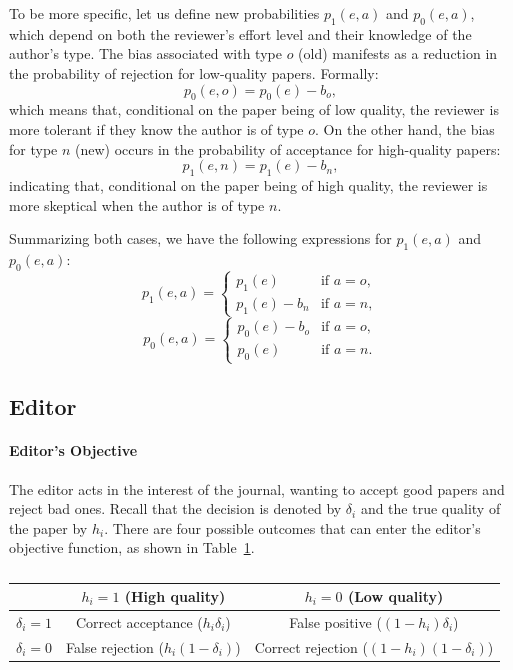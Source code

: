 \documentclass[12pt]{article}
\begin{document}
To be more specific, let us define new probabilities $p_1(e, a)$ and $p_0(e,
    a)$, which depend on both the reviewer's effort level and their knowledge of
the author's type. The bias associated with type $o$ (old) manifests as a
reduction in the probability of rejection for low-quality papers. Formally:
\[
    p_0(e, o) = p_0(e) - b_o,
\]
which means that, conditional on the paper being of low quality, the reviewer
is more tolerant if they know the author is of type $o$. On the other hand, the
bias for type $n$ (new) occurs in the probability of acceptance for
high-quality papers:
\[
    p_1(e, n) = p_1(e) - b_n,
\]
indicating that, conditional on the paper being of high quality, the reviewer
is more skeptical when the author is of type $n$.

Summarizing both cases, we have the following expressions for $p_1(e, a)$ and
$p_0(e, a)$:
\[
    p_1(e, a) =
    \begin{cases}
        p_1(e)       & \text{if } a = o, \\
        p_1(e) - b_n & \text{if } a = n,
    \end{cases}
\]
\[
    p_0(e, a) =
    \begin{cases}
        p_0(e) - b_o & \text{if } a = o, \\
        p_0(e)       & \text{if } a = n.
    \end{cases}
\]

\subsection{Editor}
\paragraph{Editor's Objective}
The editor acts in the interest of the journal, wanting to accept good papers
and reject bad ones. Recall that the decision is denoted by $\delta_i$ and the
true quality of the paper by $h_i$. There are four possible outcomes that can
enter the editor's objective function, as shown in
Table~\ref{tab:editor_objective}.

\begin{table}[!htbp]
    \centering
    \begin{tabular}{c|c|c}
        \toprule
                       & $h_i = 1$ (High quality)               & $h_i = 0$ (Low quality)                        \\ \midrule
        $\delta_i = 1$ & Correct acceptance ($h_i \delta_i$)    & False positive ($(1 - h_i) \delta_i$)          \\
        $\delta_i = 0$ & False rejection ($h_i (1 - \delta_i)$) & Correct rejection ($(1 - h_i) (1 - \delta_i)$) \\
        \bottomrule
    \end{tabular}
    \caption{}
    \label{tab:editor_objective}
\end{table}
\end{document}
